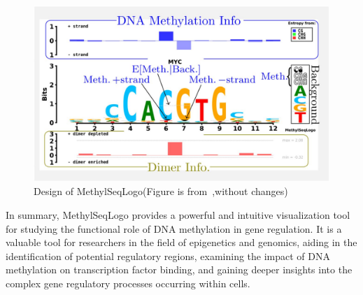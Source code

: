 \documentclass{PHlab-thesis}
\begin{document}
\begin{figure}[H]
	\centering
	\includegraphics[scale=1]{figures/F1.large.jpg}
	\caption{Design of MethylSeqLogo(Figure is from~\cite{Hsu2022.11.05.515271},without changes)}
	\label{fig:F1} %
\end{figure}

In summary, MethylSeqLogo provides a powerful and intuitive visualization tool for studying the functional role of DNA methylation in gene regulation. It is a valuable tool for researchers in the field of epigenetics and genomics, aiding in the identification of potential regulatory regions, examining the impact of DNA methylation on transcription factor binding, and gaining deeper insights into the complex gene regulatory processes occurring within cells.
\end{document}
